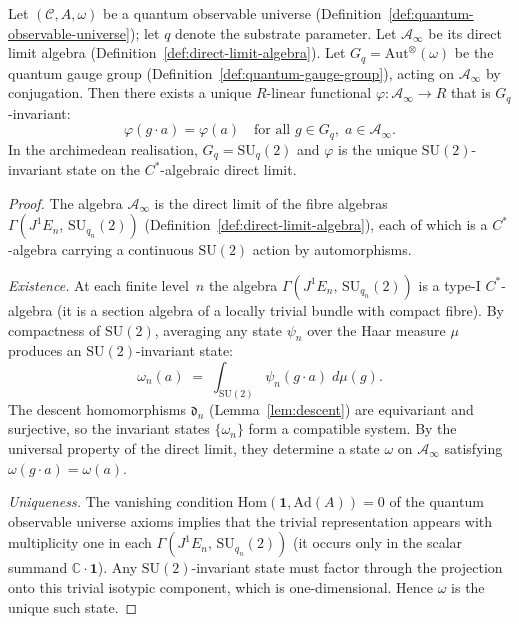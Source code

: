 
\begin{proposition}
\label{prop:vacuum-state}
Let $(\mathcal{C}, A, \omega)$ be a quantum observable universe
(Definition~\ref{def:quantum-observable-universe}); let $q$ denote the substrate parameter.  Let
$\mathcal{A}_\infty$ be its direct limit algebra
(Definition~\ref{def:direct-limit-algebra}).  Let $G_q =
\mathrm{Aut}^{\otimes}(\omega)$ be the quantum gauge group
(Definition~\ref{def:quantum-gauge-group}), acting on
$\mathcal{A}_\infty$ by conjugation.  Then there exists a unique
$R$-linear functional
$\varphi \colon \mathcal{A}_\infty \to R$ that is $G_q$-invariant:
\[
  \varphi(g \cdot a) = \varphi(a)
  \quad\text{for all } g \in G_q,\;
  a \in \mathcal{A}_\infty.
\]
In the archimedean realisation, $G_q = \mathrm{SU}_q(2)$ and
$\varphi$ is the unique $\mathrm{SU}(2)$-invariant state on the
$C^*$-algebraic direct limit.
\end{proposition}

\begin{proof}
The algebra $\mathcal{A}_\infty$ is the direct limit of the fibre algebras
$\Gamma(J^1 E_n,\, \mathrm{SU}_{q_n}(2))$
(Definition~\ref{def:direct-limit-algebra}), each of which is a
$C^*$-algebra carrying a continuous $\mathrm{SU}(2)$ action by automorphisms.

\emph{Existence.}\;
At each finite level~$n$ the algebra
$\Gamma(J^1 E_n,\, \mathrm{SU}_{q_n}(2))$ is a type-I $C^*$-algebra
(it is a section algebra of a locally trivial bundle with compact fibre).
By compactness of $\mathrm{SU}(2)$, averaging any state $\psi_n$ over the
Haar measure $\mu$ produces an $\mathrm{SU}(2)$-invariant state:
\[
  \omega_n(a)
  \;=\;
  \int_{\mathrm{SU}(2)} \psi_n(g \cdot a)\; d\mu(g).
\]
The descent homomorphisms $\mathfrak{d}_n$ (Lemma~\ref{lem:descent}) are
equivariant and surjective, so the invariant states $\{\omega_n\}$ form a
compatible system.  By the universal property of the direct limit, they
determine a state $\omega$ on $\mathcal{A}_\infty$ satisfying
$\omega(g \cdot a) = \omega(a)$.

\emph{Uniqueness.}\;
The vanishing condition
$\mathrm{Hom}(\mathbf{1}, \mathrm{Ad}(A)) = 0$ of the quantum observable
universe axioms implies that the trivial representation appears with
multiplicity one in each $\Gamma(J^1 E_n,\, \mathrm{SU}_{q_n}(2))$ (it
occurs only in the scalar summand $\mathbb{C} \cdot \mathbf{1}$).  Any
$\mathrm{SU}(2)$-invariant state must factor through the projection onto
this trivial isotypic component, which is one-dimensional.  Hence
$\omega$ is the unique such state.
\end{proof}

